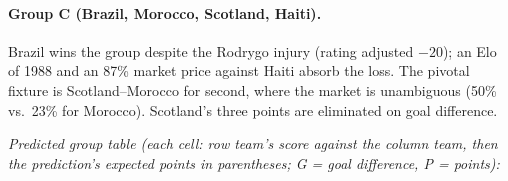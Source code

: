 \documentclass[11pt,letterpaper]{article}
\begin{document}


\paragraph{Group C (Brazil, Morocco, Scotland, Haiti).} Brazil wins the group despite the Rodrygo injury (rating adjusted $-20$); an Elo of 1988 and an 87\% market price against Haiti absorb the loss. The pivotal fixture is Scotland--Morocco for second, where the market is unambiguous (50\% vs.\ 23\% for Morocco). Scotland's three points are eliminated on goal difference.

\noindent\textit{\footnotesize Predicted group table (each cell: row team's score against the column team, then the prediction's expected points in parentheses; G = goal difference, P = points):}
\end{document}
